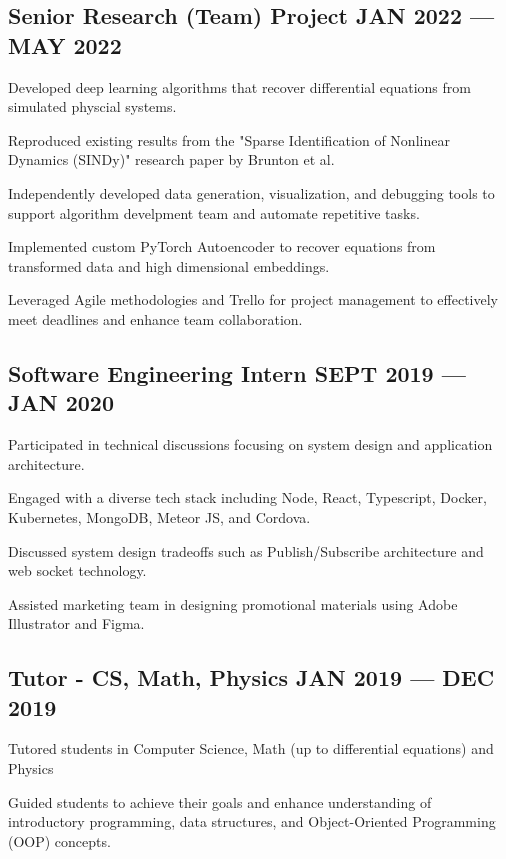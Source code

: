 \documentclass[letter,11pt]{article}
\begin{document}
\subsection{{Senior Research (Team) Project \hfill JAN 2022 --- MAY 2022}}
\begin{zitemize}
\item Developed deep learning algorithms that recover differential equations 
    from simulated physcial systems.
\item Reproduced existing results from the "Sparse Identification of Nonlinear Dynamics (SINDy)" research paper by Brunton et al.
\item Independently developed data generation, visualization, and debugging tools to support algorithm develpment team and automate repetitive tasks. 
\item Implemented custom PyTorch Autoencoder to recover equations from transformed data and high dimensional embeddings.
\item Leveraged Agile methodologies and Trello for project management to effectively meet deadlines and enhance team collaboration. 
\end{zitemize}

\subsection{{Software Engineering Intern \hfill SEPT 2019 --- JAN 2020}}
\begin{zitemize}
\item Participated in technical discussions focusing on system design and application architecture.
\item Engaged with a diverse tech stack including Node, React, Typescript, Docker, Kubernetes, MongoDB, Meteor JS, and Cordova.
\item Discussed system design tradeoffs such as Publish/Subscribe architecture and web socket technology.
\item Assisted marketing team in designing promotional materials using Adobe Illustrator and Figma.
\end{zitemize}

\subsection{{Tutor - CS, Math, Physics \hfill JAN 2019 --- DEC 2019}}
\begin{zitemize}
\item Tutored students in Computer Science, Math (up to differential equations) and Physics
\item Guided students to achieve their goals and enhance understanding of introductory programming, data structures, and Object-Oriented Programming (OOP) concepts.
\end{zitemize}
\end{document}
